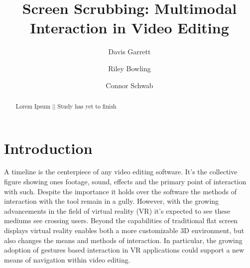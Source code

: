 \documentclass[manuscript, review]{acmart}
\begin{document}
\title{Screen Scrubbing: Multimodal Interaction in Video Editing}

\author{Davis Garrett}

\author{Riley Bowling}

\author{Connor Schwab}


\renewcommand{\shortauthors}{Garrett et al.}

\begin{abstract}
    Lorem Ipsum || Study has yet to finish
\end{abstract}



\maketitle

\section{Introduction}
A timeline is the centerpiece of any video editing software. It’s the collective figure showing ones footage, sound, effects and the primary point of interaction with such. Despite the importance it holds over the software the methods of interaction with the tool remain in a gully. However, with the growing advancements in the field of virtual reality (VR) it’s expected to see these mediums see crossing users. Beyond the capabilities of traditional flat screen displays virtual reality enables both a more customizable 3D environment, but also changes the means and methods of interaction. In particular, the growing adoption of gestures based interaction in VR applications could support a new means of navigation within video editing.
\end{document}
